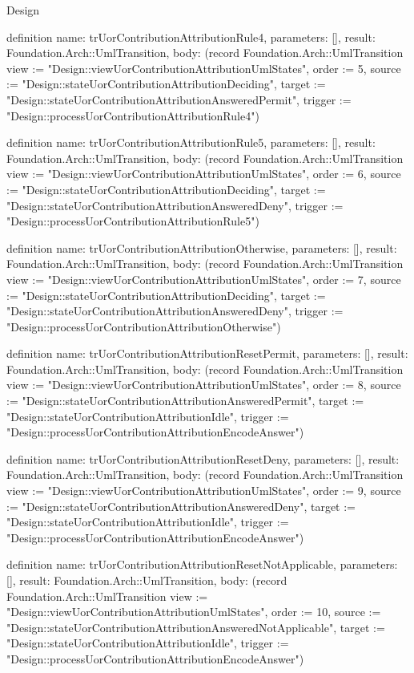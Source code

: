 \begin{lexlean}{Design}
\begin{semanticmodule}
definition{
  name: trUorContributionAttributionRule4,
  parameters: [],
  result: Foundation.Arch::UmlTransition,
  body: (record Foundation.Arch::UmlTransition {view := "Design::viewUorContributionAttributionUmlStates", order := 5, source := "Design::stateUorContributionAttributionDeciding", target := "Design::stateUorContributionAttributionAnsweredPermit", trigger := "Design::processUorContributionAttributionRule4"})
}

definition{
  name: trUorContributionAttributionRule5,
  parameters: [],
  result: Foundation.Arch::UmlTransition,
  body: (record Foundation.Arch::UmlTransition {view := "Design::viewUorContributionAttributionUmlStates", order := 6, source := "Design::stateUorContributionAttributionDeciding", target := "Design::stateUorContributionAttributionAnsweredDeny", trigger := "Design::processUorContributionAttributionRule5"})
}

definition{
  name: trUorContributionAttributionOtherwise,
  parameters: [],
  result: Foundation.Arch::UmlTransition,
  body: (record Foundation.Arch::UmlTransition {view := "Design::viewUorContributionAttributionUmlStates", order := 7, source := "Design::stateUorContributionAttributionDeciding", target := "Design::stateUorContributionAttributionAnsweredDeny", trigger := "Design::processUorContributionAttributionOtherwise"})
}

definition{
  name: trUorContributionAttributionResetPermit,
  parameters: [],
  result: Foundation.Arch::UmlTransition,
  body: (record Foundation.Arch::UmlTransition {view := "Design::viewUorContributionAttributionUmlStates", order := 8, source := "Design::stateUorContributionAttributionAnsweredPermit", target := "Design::stateUorContributionAttributionIdle", trigger := "Design::processUorContributionAttributionEncodeAnswer"})
}

definition{
  name: trUorContributionAttributionResetDeny,
  parameters: [],
  result: Foundation.Arch::UmlTransition,
  body: (record Foundation.Arch::UmlTransition {view := "Design::viewUorContributionAttributionUmlStates", order := 9, source := "Design::stateUorContributionAttributionAnsweredDeny", target := "Design::stateUorContributionAttributionIdle", trigger := "Design::processUorContributionAttributionEncodeAnswer"})
}

definition{
  name: trUorContributionAttributionResetNotApplicable,
  parameters: [],
  result: Foundation.Arch::UmlTransition,
  body: (record Foundation.Arch::UmlTransition {view := "Design::viewUorContributionAttributionUmlStates", order := 10, source := "Design::stateUorContributionAttributionAnsweredNotApplicable", target := "Design::stateUorContributionAttributionIdle", trigger := "Design::processUorContributionAttributionEncodeAnswer"})
}


\end{semanticmodule}
\end{lexlean}
